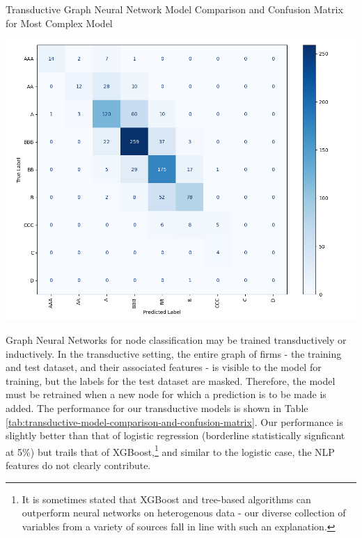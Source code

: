 \documentclass{article}[11pt]
\begin{document}
    \begin{table}[h!]
        \centering
        \caption{Transductive Graph Neural Network Model Comparison and Confusion Matrix for Most Complex Model}
        \begin{minipage}[c]{0.495\linewidth}
            \centering
            
        \end{minipage}
        \begin{minipage}[c]{0.495\linewidth}
            \centering
            \includegraphics[width=0.95\hsize]{../Output/Modelling/Graph Neural Network/Transductive/confusion_matrix_no_title.png}
        \end{minipage}
        \label{tab:transductive-model-comparison-and-confusion-matrix}
    \end{table}

    Graph Neural Networks for node classification may be trained transductively or inductively. In the transductive setting, the entire graph of firms - the training and test dataset, and their associated features - is visible to the model for training, but the labels for the test dataset are masked. Therefore, the model must be retrained when a new node for which a prediction is to be made is added. The performance for our transductive models is shown in Table \ref{tab:transductive-model-comparison-and-confusion-matrix}. Our performance is slightly better than that of logistic regression (borderline statistically signficant at 5\%) but trails that of XGBoost,\footnote{It is sometimes stated that XGBoost and tree-based algorithms can outperform neural networks on heterogenous data - our diverse collection of variables from a variety of sources fall in line with such an explanation.} and similar to the logistic case, the NLP features do not clearly contribute.
\end{document}

